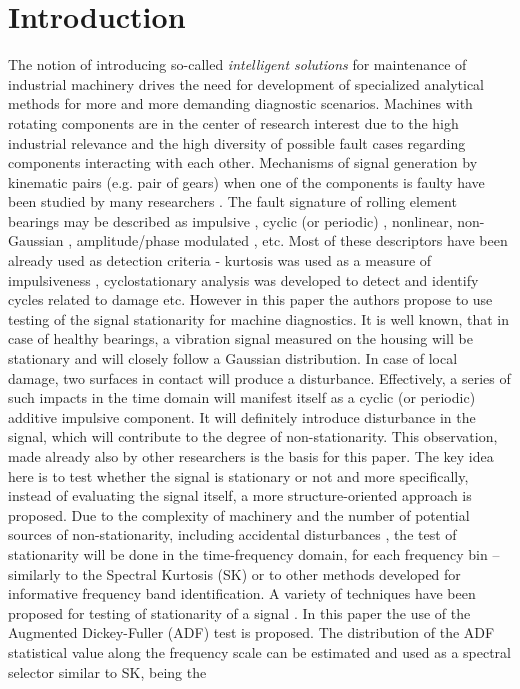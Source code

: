 \documentclass[11pt]{article}
\begin{document}
\maketitle

\section{Introduction}
The notion of introducing so-called \emph{intelligent solutions} for maintenance of industrial machinery drives the need for development of specialized analytical methods for more and more demanding diagnostic scenarios. Machines with rotating components are in the center of research interest due to the high industrial relevance and the high diversity of possible fault cases regarding components interacting with each other. Mechanisms of signal generation by kinematic pairs (e.g. pair of gears) when one of the components is faulty have been studied by many researchers \cite{randall1982new,chaari2008effect,antoni2002differential,antoni2003stochastic}. The fault signature of rolling element bearings may be described as impulsive \cite{antoni2006spectral}, cyclic (or periodic) \cite{michalak2017application}, nonlinear, non-Gaussian \cite{wylomanska2016application}, amplitude/phase modulated \cite{chaari2012gearbox}, etc. Most of these descriptors have been already used as detection criteria - kurtosis was used as a measure of impulsiveness \cite{wodecki2018optimal}, cyclostationary analysis was developed to detect and identify cycles related to damage \cite{wodecki2017informative, kruczek2017multiple} etc. However in this paper the authors propose to use testing of the signal stationarity for machine diagnostics. It is well known, that in case of healthy bearings, a vibration signal measured on the housing will be stationary and will closely follow a Gaussian distribution. In case of local damage, two surfaces in contact will produce a disturbance. Effectively, a series of such impacts in the time domain will manifest itself as a cyclic (or periodic) additive impulsive component. It will definitely introduce disturbance in the signal, which will contribute to the degree of non-stationarity. This observation, made already also by other researchers \cite{martin2007advanced} is the basis for this paper. The key idea here is to test whether the signal is stationary or not and more specifically, instead of evaluating the signal itself, a more structure-oriented approach is proposed. Due to the complexity of machinery and the number of potential sources of non-stationarity, including accidental disturbances \cite{wodecki2017local,zak2017measures}, the test of stationarity will be done in the time-frequency domain, for each frequency bin -- similarly to the Spectral Kurtosis (SK) or to other methods developed for informative frequency band identification. A variety of techniques have been proposed for testing of stationarity of a signal \cite{dickey1979distribution,durbin1951testing,kwiatkowski1992testing}. In this paper the use of the Augmented Dickey-Fuller (ADF) test \cite{dickey1979distribution} is proposed. The distribution of the ADF statistical value along the frequency scale can be estimated and used as a spectral selector similar to SK, being the 
\end{document}
